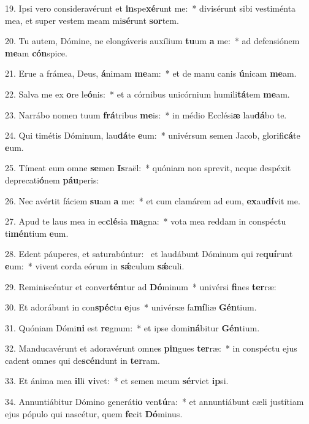 19. Ipsi vero consideravérunt et \textbf{in}spe\textbf{xé}runt me:~*  divisérunt sibi vestiménta mea, et super vestem meam mi\textbf{sé}runt \textbf{sor}tem.\

20. Tu autem, Dómine, ne elongáveris auxílium \textbf{tu}um \textbf{a} me:~*  ad defensiónem \textbf{me}am \textbf{cón}spice.\

21. Erue a frámea, Deus, \textbf{á}nimam \textbf{me}am:~*  et de manu canis \textbf{ú}nicam \textbf{me}am.\

22. Salva me ex \textbf{o}re le\textbf{ó}nis:~*  et a córnibus unicórnium humili\textbf{tá}tem \textbf{me}am.\

23. Narrábo nomen tuum \textbf{frá}tribus \textbf{me}is:~*  in médio Ecclési\textbf{æ} lau\textbf{dá}bo te.\

24. Qui timétis Dóminum, lau\textbf{dá}te \textbf{e}um:~*  univérsum semen Jacob, glorifi\textbf{cá}te \textbf{e}um.\

25. Tímeat eum omne \textbf{se}men \textbf{Is}raël:~*  quóniam non sprevit, neque despéxit deprecati\textbf{ó}nem \textbf{páu}peris:\

26. Nec avértit fáciem \textbf{su}am \textbf{a} me:~*  et cum clamárem ad eum, \textbf{ex}au\textbf{dí}vit me.\

27. Apud te laus mea in ec\textbf{clé}sia \textbf{ma}gna:~*  vota mea reddam in conspéctu ti\textbf{mén}tium \textbf{e}um.\

28. Edent páuperes, et saturabúntur: \dag\  et laudábunt Dóminum qui re\textbf{quí}runt \textbf{e}um:~*  vivent corda eórum in \textbf{sǽ}culum \textbf{sǽ}culi.\

29. Reminiscéntur et conver\textbf{tén}tur ad \textbf{Dó}minum~*  univérsi \textbf{fi}nes \textbf{ter}ræ:\

30. Et adorábunt in con\textbf{spéc}tu \textbf{e}jus~*  univérsæ fa\textbf{mí}liæ \textbf{Gén}tium.\

31. Quóniam Dómi\textbf{ni} est \textbf{re}gnum:~*  et ipse domi\textbf{ná}bitur \textbf{Gén}tium.\

32. Manducavérunt et adoravérunt omnes \textbf{pin}gues \textbf{ter}ræ:~*  in conspéctu ejus cadent omnes qui de\textbf{scén}dunt in \textbf{ter}ram.\

33. Et ánima mea \textbf{il}li \textbf{vi}vet:~*  et semen meum \textbf{sér}viet \textbf{ip}si.\

34. Annuntiábitur Dómino generáti\textbf{o} ven\textbf{tú}ra:~*  et annuntiábunt cæli justítiam ejus pópulo qui nascétur, quem \textbf{fe}cit \textbf{Dó}minus.\


